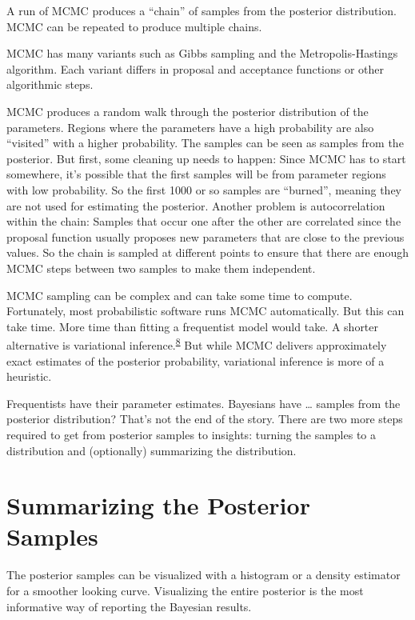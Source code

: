 \documentclass[
  10pt,
]{scrbook}
\begin{document}
A run of MCMC produces a ``chain'' of samples from the posterior distribution.
MCMC can be repeated to produce multiple chains.

MCMC has many variants such as Gibbs sampling and the Metropolis-Hastings algorithm.
Each variant differs in proposal and acceptance functions or other algorithmic steps.

MCMC produces a random walk through the posterior distribution of the parameters.
Regions where the parameters have a high probability are also ``visited'' with a higher probability.
The samples can be seen as samples from the posterior.
But first, some cleaning up needs to happen:
Since MCMC has to start somewhere, it's possible that the first samples will be from parameter regions with low probability.
So the first 1000 or so samples are ``burned'', meaning they are not used for estimating the posterior.
Another problem is autocorrelation within the chain:
Samples that occur one after the other are correlated since the proposal function usually proposes new parameters that are close to the previous values.
So the chain is sampled at different points to ensure that there are enough MCMC steps between two samples to make them independent.

MCMC sampling can be complex and can take some time to compute.
Fortunately, most probabilistic software runs MCMC automatically.
But this can take time.
More time than fitting a frequentist model would take.
A shorter alternative is variational inference.\textsuperscript{\protect\hyperlink{ref-blei2017variational}{8}}
But while MCMC delivers approximately exact estimates of the posterior probability, variational inference is more of a heuristic.

Frequentists have their parameter estimates.
Bayesians have \ldots{} samples from the posterior distribution?
That's not the end of the story.
There are two more steps required to get from posterior samples to insights: turning the samples to a distribution and (optionally) summarizing the distribution.

\hypertarget{summarizing-the-posterior-samples}{%
\section{Summarizing the Posterior Samples}\label{summarizing-the-posterior-samples}}

The posterior samples can be visualized with a histogram or a density estimator for a smoother looking curve.
Visualizing the entire posterior is the most informative way of reporting the Bayesian results.
\end{document}
